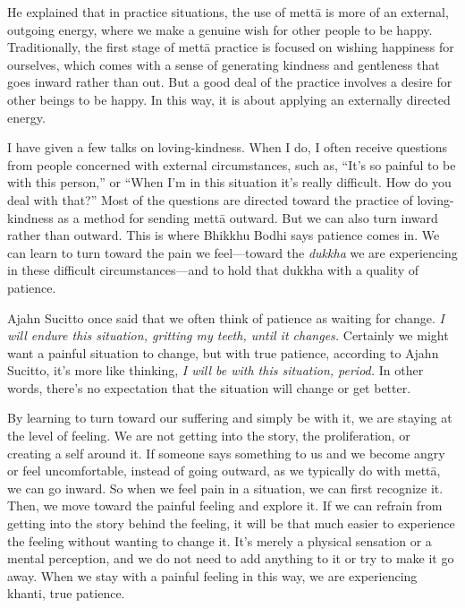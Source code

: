 He explained that in practice situations, the use of mettā is more of 
an external, outgoing energy, where we make a genuine wish for other 
people to be happy. Traditionally, the first stage of mettā practice 
is focused on wishing happiness for ourselves, which comes with a sense 
of generating kindness and gentleness that goes inward rather than out. 
But a good deal of the practice involves a desire for other beings to 
be happy. In this way, it is about applying an externally directed 
energy.

I have given a few talks on loving-kindness. When I do, I often receive 
questions from people concerned with external circumstances, such as, 
``It's so painful to be with this person,'' or ``When I'm in this 
situation it's really difficult. How do you deal with that?'' Most of 
the questions are directed toward the practice of loving-kindness as a 
method for sending mettā outward. But we can also turn inward rather 
than outward. This is where Bhikkhu Bodhi says patience comes in. We 
can learn to turn toward the pain we feel---toward the \emph{dukkha} we 
are experiencing in these difficult circumstances---and to hold that 
dukkha with a quality of patience.

Ajahn Sucitto once said that we often think of patience as waiting for 
change. \emph{I will endure this situation, gritting my teeth, until it 
changes.} Certainly we might want a painful situation to change, but 
with true patience, according to Ajahn Sucitto, it's more like 
thinking, \emph{I will be with this situation, period.} In other words, 
there's no expectation that the situation will change or get better.

By learning to turn toward our suffering and simply be with it, we are 
staying at the level of feeling. We are not getting into the story, the 
proliferation, or creating a self around it. If someone says something 
to us and we become angry or feel uncomfortable, instead of going 
outward, as we typically do with mettā, we can go inward. So when we 
feel pain in a situation, we can first recognize it. Then, we move 
toward the painful feeling and explore it. If we can refrain from 
getting into the story behind the feeling, it will be that much easier 
to experience the feeling without wanting to change it. It's merely a 
physical sensation or a mental perception, and we do not need to add 
anything to it or try to make it go away. When we stay with a painful 
feeling in this way, we are experiencing khanti, true patience.


